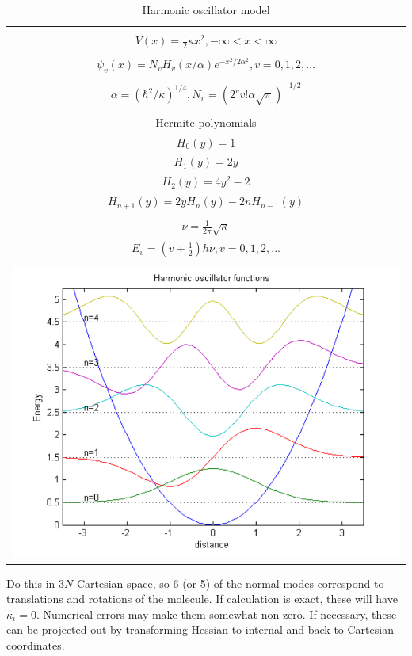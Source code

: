 \documentclass[11pt]{article}
\begin{document}
\begin{table}[]
   \begin{center}
   \caption{Harmonic oscillator model}
    \label{Harmonic-oscillator}
\begin{tabular}[h]{|c|}
\hline
 \\
$\displaystyle       V(x) = \frac{1}{2} \kappa x^2, -\infty < x < \infty $ \\
 \\
$\displaystyle     \psi_v(x) = N_v H_v(x/\alpha)e^{-x^2/2\alpha^2}, v = 0, 1, 2, \ldots $ \\
\\
$\displaystyle \alpha=(\hbar^2/\kappa)^{1/4}, N_v=(2^vv!\alpha\sqrt{\pi})^{-1/2} $ \\
 \\
\underline{Hermite polynomials} \\
$\displaystyle H_0(y) =1$\\
$\displaystyle H_1(y) = 2y$\\
$\displaystyle H_2(y) = 4y^2-2$\\
$\displaystyle H_{n+1}(y) = 2 y H_n(y) -2 n H_{n-1}(y)$\\
 \\
$\displaystyle     \nu =\frac{1}{2\pi}\sqrt{\kappa}$ \\
$\displaystyle     E_v=\left (v+\frac{1}{2}\right )h \nu, v=0, 1, 2, ...$ \\
 \\
     \includegraphics[scale=.8]{./Images/HO} \\       
\hline
\end{tabular}
 \end{center}
\end{table}
Do this in \(3N\) Cartesian space, so 6 (or 5) of the normal modes correspond to translations and rotations of the molecule.  If calculation is exact, these will have \(\kappa_i = 0\).  Numerical errors may make them somewhat non-zero.  If necessary, these can be projected out by transforming Hessian to internal and back to Cartesian coordinates.
\end{document}
